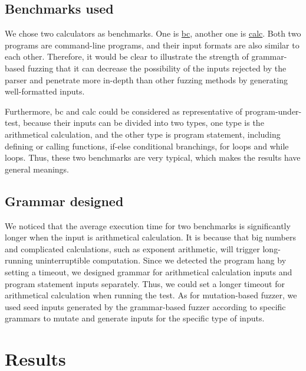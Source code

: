 \documentclass[11pt,a4paper]{article}
\begin{document}
%
\subsection{Benchmarks used}
We chose two calculators as benchmarks. One is \href{https://www.gnu.org/software/bc/manual/html_mono/bc.html}{\cc bc}, another one is \href{https://www.systutorials.com/docs/linux/man/1-calc/}{\cc calc}. 
Both two programs are command-line programs, and their input formats are also similar to each other. Therefore, it would be clear to illustrate the strength of grammar-based fuzzing that it can decrease the possibility of the inputs rejected by the parser and penetrate more in-depth than other fuzzing methods by generating well-formatted inputs.

Furthermore, {\cc bc} and {\cc calc} could be considered as representative of program-under-test, because their inputs can be divided into two types, one type is the arithmetical calculation, and the other type is program statement, including defining or calling functions, if-else conditional branchings, for loops and while loops. Thus, these two benchmarks are very typical, which makes the results have general meanings.
%
\subsection{Grammar designed}
We noticed that the average execution time for two benchmarks is significantly longer when the input is arithmetical calculation. It is because that big numbers and complicated calculations, such as exponent arithmetic, will trigger long-running uninterruptible computation.
Since we detected the program hang by setting a timeout, we designed grammar for arithmetical calculation inputs and program statement inputs separately. Thus, we could set a longer timeout for arithmetical calculation when running the test. As for mutation-based fuzzer, we used seed inputs generated by the grammar-based fuzzer according to specific grammars to mutate and generate inputs for the specific type of inputs. 
\section{Results}
\end{document}
